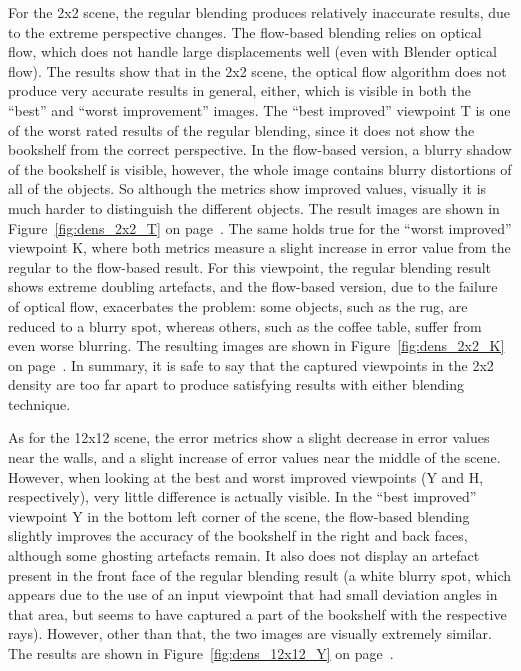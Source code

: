 For the 2x2 scene, the regular blending produces relatively inaccurate results, due to the extreme perspective changes. The flow-based blending relies on optical flow, which does not handle large displacements well (even with Blender optical flow). The results show that in the 2x2 scene, the optical flow algorithm does not produce very accurate results in general, either, which is visible in both the ``best'' and ``worst improvement'' images.
The ``best improved'' viewpoint T is one of the worst rated results of the regular blending, since it does not show the bookshelf from the correct perspective. In the flow-based version, a blurry shadow of the bookshelf is visible, however, the whole image contains blurry distortions of all of the objects. So although the metrics show improved values, visually it is much harder to distinguish the different objects. The result images are shown in Figure~\ref{fig:dens_2x2_T} on page~\pageref{fig:dens_2x2_T}.
The same holds true for the ``worst improved'' viewpoint K, where both metrics measure a slight increase in error value from the regular to the flow-based result. For this viewpoint, the regular blending result shows extreme doubling artefacts, and the flow-based version, due to the failure of optical flow, exacerbates the problem: some objects, such as the rug, are reduced to a blurry spot, whereas others, such as the coffee table, suffer from even worse blurring. The resulting images are shown in Figure~\ref{fig:dens_2x2_K} on page~\pageref{fig:dens_2x2_K}. In summary, it is safe to say that the captured viewpoints in the 2x2 density are too far apart to produce satisfying results with either blending technique.

As for the 12x12 scene, the error metrics show a slight decrease in error values near the walls, and a slight increase of error values near the middle of the scene. However, when looking at the best and worst improved viewpoints (Y and H, respectively), very little difference is actually visible.
In the ``best improved'' viewpoint Y in the bottom left corner of the scene, the flow-based blending slightly improves the accuracy of the bookshelf in the right and back faces, although some ghosting artefacts remain. It also does not display an artefact present in the front face of the regular blending result (a white blurry spot, which appears due to the use of an input viewpoint that had small deviation angles in that area, but seems to have captured a part of the bookshelf with the respective rays). However, other than that, the two images are visually extremely similar. The results are shown in Figure~\ref{fig:dens_12x12_Y} on page~\pageref{fig:dens_12x12_Y}.

